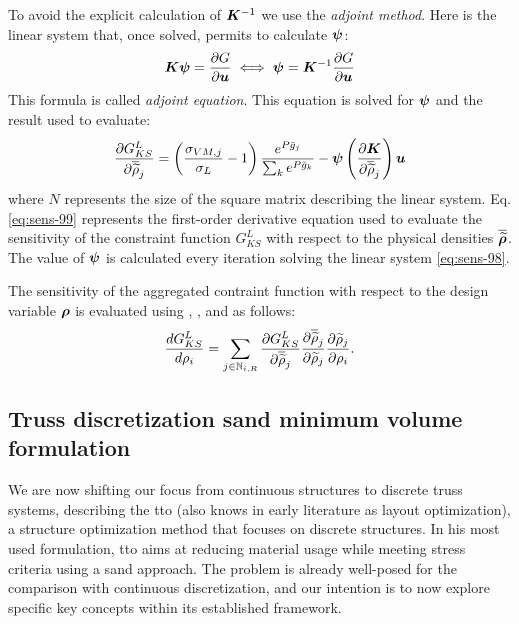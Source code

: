 To avoid the explicit calculation of $\bm{K}^{-1}$ we use the \textit{adjoint method}. Here is the linear system that, once solved, permits to calculate $\bm{\psi}$:
\begin{equation} \label{eq:sens-98}
    \bm{K}\bm{\psi} = \frac{\partial G}{\partial\bm{u}} \iff \bm{\psi} = \bm{K}^{-1}\frac{\partial G}{\partial\bm{u}}
\end{equation}
This formula is called \textit{adjoint equation}. This equation is solved for $\bm{\psi}$ and the result used to evaluate:
\begin{equation}\label{eq:sens-99}
\frac{\partial G_{KS}^L}{\partial\overline{\widetilde{\rho}}_j} = \left(\frac{ \sigma_{VM,j}}{\sigma_L}-1 \right) \frac{e^{{P}\bar{g}_j}}{\sum_k e^{{P}\bar{g}_k}} - \bm{\psi} \left(\frac{\partial\bm{K}}{\partial\overline{\widetilde{\rho}}_{j}}\right) \bm{u}
\end{equation}
 where $N$ represents the size of the square matrix describing the linear system.
Eq. \ref{eq:sens-99} represents the first-order derivative equation used to evaluate the sensitivity of the constraint function $G_{KS}^L$ with respect to the physical densities $\bm{\overline{\widetilde{\rho}}}$. The value of $\bm{\psi}$ is calculated every iteration solving the linear system \ref{eq:sens-98}.

The sensitivity of the aggregated contraint function with respect to the design variable $\bm{\rho}$ is evaluated using  , , and  as follows:
\begin{equation}
    \frac{d G_{KS}^L}{d \rho_i} = \sum_{j \in \mathbb{N}_{i,R}} \frac{\partial G_{KS}^L}{\partial\overline{\widetilde{\rho}}_j} \frac{\partial\overline{\widetilde{\rho}}_j}{\partial\widetilde{\rho}_j} \frac{\partial\widetilde{\rho}_j}{\partial\rho_i}.
\end{equation}

\subsection{Truss discretization \gls{sand} minimum volume formulation}
We are now shifting our focus from continuous structures to discrete truss systems, describing the \gls{tto} (also knows in early literature as layout optimization), a structure optimization method that focuses on discrete structures. In his most used formulation, \gls{tto} aims at reducing material usage while meeting stress criteria using a \gls{sand} approach. The problem is already well-posed for the comparison with continuous discretization, and our intention is to now explore specific key concepts within its established framework.
